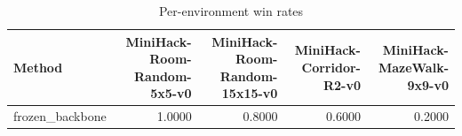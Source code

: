 \begin{table}[htbp]
\centering
\caption{Per-environment win rates}
\label{tab:per-env}
\begin{tabular}{lrrrr}
\toprule
\textbf{Method} & \textbf{MiniHack-Room-Random-5x5-v0} & \textbf{MiniHack-Room-Random-15x15-v0} & \textbf{MiniHack-Corridor-R2-v0} & \textbf{MiniHack-MazeWalk-9x9-v0} \\
\midrule
frozen\_backbone & 1.0000 & 0.8000 & 0.6000 & 0.2000 \\
\bottomrule
\end{tabular}
\end{table}